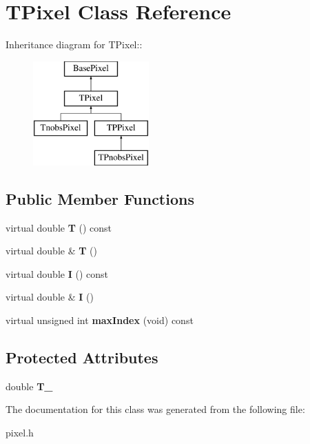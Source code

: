 \hypertarget{classTPixel}{
\section{TPixel Class Reference}
\label{classTPixel}
}
Inheritance diagram for TPixel::\begin{figure}[H]
\begin{center}
\leavevmode
\includegraphics[height=4cm]{classTPixel}
\end{center}
\end{figure}
\subsection*{Public Member Functions}
\begin{DoxyCompactItemize}
\item 
\hypertarget{classTPixel_a3c4b4efd7db70dcdf848f1bf82736430}{
virtual double {\bfseries T} () const }
\label{classTPixel_a3c4b4efd7db70dcdf848f1bf82736430}

\item 
\hypertarget{classTPixel_ab743cb9aec0026714275479880070526}{
virtual double \& {\bfseries T} ()}
\label{classTPixel_ab743cb9aec0026714275479880070526}

\item 
\hypertarget{classTPixel_a0f2b0c68ba4806c78a717899d550beda}{
virtual double {\bfseries I} () const }
\label{classTPixel_a0f2b0c68ba4806c78a717899d550beda}

\item 
\hypertarget{classTPixel_a044952eab36a605d44114600cb379ff1}{
virtual double \& {\bfseries I} ()}
\label{classTPixel_a044952eab36a605d44114600cb379ff1}

\item 
\hypertarget{classTPixel_a7caf5d365d01a5d7c6ac0765df7f29ed}{
virtual unsigned int {\bfseries maxIndex} (void) const }
\label{classTPixel_a7caf5d365d01a5d7c6ac0765df7f29ed}

\end{DoxyCompactItemize}
\subsection*{Protected Attributes}
\begin{DoxyCompactItemize}
\item 
\hypertarget{classTPixel_ac6a0cb8b96157e4e9f9594fa9add721a}{
double {\bfseries T\_\-}}
\label{classTPixel_ac6a0cb8b96157e4e9f9594fa9add721a}

\end{DoxyCompactItemize}


The documentation for this class was generated from the following file:\begin{DoxyCompactItemize}
\item 
pixel.h\end{DoxyCompactItemize}
